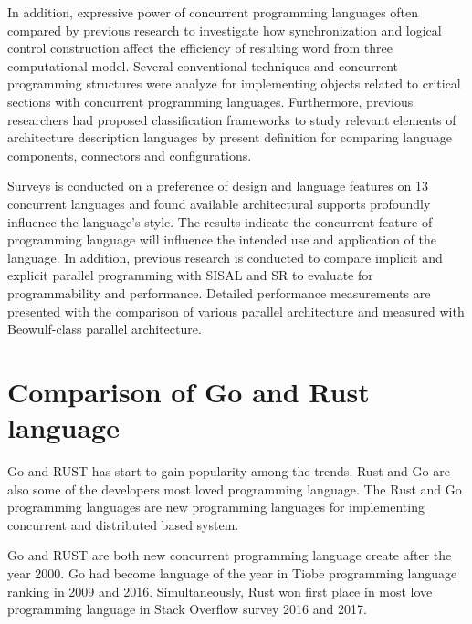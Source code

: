 In addition, expressive power of concurrent programming languages often compared by previous research to investigate how synchronization and logical control construction affect the efficiency of resulting word from three computational model. \cite{family-of-concurrency-languages} Several conventional techniques and concurrent programming structures were analyze for implementing objects related to critical sections with concurrent programming languages. \cite{methodology-concurrent-object} Furthermore, previous researchers had proposed classification frameworks to study relevant elements of architecture description languages by present definition for comparing language components, connectors and configurations. \cite{framework-classifying-language} 

Surveys is conducted on a preference of design and language features on 13 concurrent languages and found available architectural supports profoundly influence the language's style. The results indicate the concurrent feature of programming language will influence the intended use and application of the language. \cite{concurrent-programming-survey} In addition, previous research is conducted to compare implicit and explicit parallel programming with SISAL and SR to evaluate for programmability and performance. \cite{compare-explicit-implicit-concurrent-language} Detailed performance measurements are presented with the comparison of various parallel architecture and measured with Beowulf-class parallel architecture. \cite{compare-parallel-functional-languages}

\section{Comparison of Go and Rust language}

Go and RUST has start to gain popularity among the trends. \cite{distributed-programming} Rust and Go are also some of the developers most loved programming language. \cite{developer-survey-results} The Rust and Go programming languages are new programming languages for implementing concurrent and distributed based system. \cite{error-handling-in-rust-go} 

Go and RUST are both new concurrent programming language create after the year 2000. Go had become language of the year in Tiobe programming language ranking in 2009 and 2016. \cite{tiobe-go} Simultaneously, Rust won first place in most love programming language in Stack Overflow survey 2016 and 2017. \cite{stackoverflow-rust}


